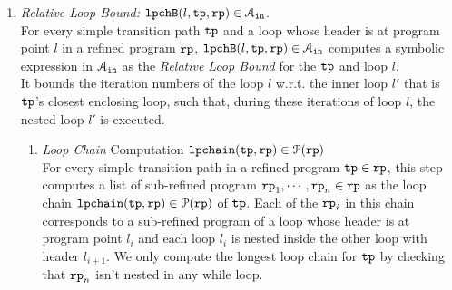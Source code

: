 \begin{enumerate}
%
\item \emph{Relative Loop Bound:} $\mathtt{lpchB}(l, \mathtt{tp}, \mathtt{rp}) \in \mathcal{A}_{\mathtt{in}}$.
\\
For every simple transition path $\mathtt{tp}$
and a loop whose header is at program point $l$ in a refined program $\mathtt{rp}$,
 $\mathtt{lpchB}(l, \mathtt{tp}, \mathtt{rp}) \in \mathcal{A}_{\mathtt{in}}$ computes a symbolic expression in $\mathcal{A}_{\mathtt{in}}$
as the \emph{Relative Loop Bound} for the $\mathtt{tp}$ and loop $l$.
\\
It bounds the iteration numbers of the loop $l$ w.r.t.
the inner loop $l'$ that is $\mathtt{tp}$'s closest enclosing loop,
such that,
during these iterations of loop $l$, the nested loop $l'$ is executed.
\begin{enumerate}
  \item \emph{Loop Chain} Computation $\mathtt{lpchain}(\mathtt{tp}, \mathtt{rp}) \in \mathcal{P}(\mathtt{rp})$ 
  \\
  For every simple transition path in a refined program $\mathtt{tp} \in \mathtt{rp}$,
  this step computes 
  a list of sub-refined program $\mathtt{rp}_1, \cdots, \mathtt{rp}_n \in \mathtt{rp}$
  as the loop chain $\mathtt{lpchain}(\mathtt{tp}, \mathtt{rp}) \in \mathcal{P}(\mathtt{rp})$ of $\mathtt{tp}$.
  Each of the $\mathtt{rp}_i$ in this chain corresponds to a sub-refined program of a loop whose header is at program point $l_i$ and
 each loop $l_{i}$ is nested inside the other loop with header $l_{i+1}$.
 We only compute the longest loop chain for $\mathtt{tp}$ by checking that
$\mathtt{rp}_n$ isn't nested in any while loop.
\begin{defn}

\end{defn}
\end{enumerate}
\end{enumerate}
